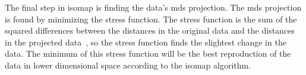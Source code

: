The final step in \gls{isomap} is finding the data's \gls{mds} projection. The \gls{mds} projection is found by minimizing the stress function. The stress function is the sum of the squared differences between the distances in the original data and the distances in the projected data~\cite{multi-dimensional-scaling-leeuw}, so the stress function finds the slightest change in the data. The minimum of this stress function will be the best reproduction of the data in lower dimensional space according to the \gls{isomap} algorithm.












